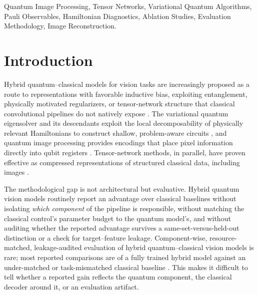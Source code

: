 \documentclass[journal]{IEEEtran}
\begin{document}
\begin{abstract}
variant is equivariant to the symmetries of the square by construction, verified numerically to $9.6\times10^{-17}$ mean error against $0.74$--$0.84$ for unpooled variants. Our contribution is therefore the evaluation protocol itself --- a resource-matched ablation and leakage-audited statistical validation suite --- together with a clean, reproducible result on natural-image reconstruction, a transferable leakage diagnostic, and a narrowly scoped, honestly bounded trio of positive results (entanglement-necessity, its training-dynamics signature, and provable symmetry) that do not extrapolate into a natural-image or hardware quantum-advantage claim.
\end{abstract}

\begin{IEEEkeywords}
Quantum Image Processing, Tensor Networks, Variational Quantum Algorithms, Pauli Observables, Hamiltonian Diagnostics, Ablation Studies, Evaluation Methodology, Image Reconstruction.
\end{IEEEkeywords}

\section{Introduction}
Hybrid quantum--classical models for vision tasks are increasingly proposed as a route to representations with favorable inductive bias, exploiting entanglement, physically motivated regularizers, or tensor-network structure that classical convolutional pipelines do not natively expose \cite{Cerezo2021, Tilly2022, Preskill2018}. The variational quantum eigensolver and its descendants exploit the local decomposability of physically relevant Hamiltonians to construct shallow, problem-aware circuits \cite{Cerezo2021, Tilly2022, Bauer2020}, and quantum image processing provides encodings that place pixel information directly into qubit registers \cite{Chakraborty2018, Zhou2017, Yao2017}. Tensor-network methods, in parallel, have proven effective as compressed representations of structured classical data, including images \cite{Cirac2021, Latorre2005, Han2018, Stoudenmire2016, Fei2021, Guala2023, Araz2022}.

The methodological gap is not architectural but evaluative. Hybrid quantum vision models routinely report an advantage over classical baselines without isolating \emph{which component} of the pipeline is responsible, without matching the classical control's parameter budget to the quantum model's, and without auditing whether the reported advantage survives a same-set-versus-held-out distinction or a check for target--feature leakage. Component-wise, resource-matched, leakage-audited evaluation of hybrid quantum--classical vision models is rare; most reported comparisons are of a fully trained hybrid model against an under-matched or task-mismatched classical baseline \cite{Haga2024, Zhai2025, Nau2023, Liu2022}. This makes it difficult to tell whether a reported gain reflects the quantum component, the classical decoder around it, or an evaluation artifact.
\end{document}
